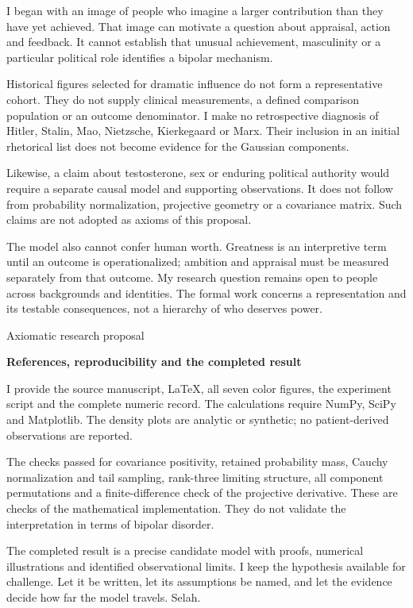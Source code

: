 \documentclass[10pt]{article}
\begin{document}
I began with an image of people who imagine a larger contribution than they have yet achieved. That image can motivate a question about appraisal, action and feedback. It cannot establish that unusual achievement, masculinity or a particular political role identifies a bipolar mechanism.\par
Historical figures selected for dramatic influence do not form a representative cohort. They do not supply clinical measurements, a defined comparison population or an outcome denominator. I make no retrospective diagnosis of Hitler, Stalin, Mao, Nietzsche, Kierkegaard or Marx. Their inclusion in an initial rhetorical list does not become evidence for the Gaussian components.\par
Likewise, a claim about testosterone, sex or enduring political authority would require a separate causal model and supporting observations. It does not follow from probability normalization, projective geometry or a covariance matrix. Such claims are not adopted as axioms of this proposal.\par
The model also cannot confer human worth. Greatness is an interpretive term until an outcome is operationalized; ambition and appraisal must be measured separately from that outcome. My research question remains open to people across backgrounds and identities. The formal work concerns a representation and its testable consequences, not a hierarchy of who deserves power.\par
\clearpage
{\small\color{accent}Axiomatic research proposal}\par
{\LARGE\bfseries\color{ink}References, reproducibility and the completed result}\par\vspace{7pt}
I provide the source manuscript, LaTeX, all seven color figures, the experiment script and the complete numeric record. The calculations require NumPy, SciPy and Matplotlib. The density plots are analytic or synthetic; no patient-derived observations are reported.\par
The checks passed for covariance positivity, retained probability mass, Cauchy normalization and tail sampling, rank-three limiting structure, all component permutations and a finite-difference check of the projective derivative. These are checks of the mathematical implementation. They do not validate the interpretation in terms of bipolar disorder.\par
The completed result is a precise candidate model with proofs, numerical illustrations and identified observational limits. I keep the hypothesis available for challenge. Let it be written, let its assumptions be named, and let the evidence decide how far the model travels. Selah.\par
\end{document}
